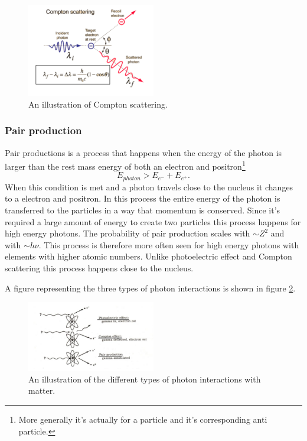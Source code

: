 \documentclass[jmp, amsmath, amssymb, reprint]{article}
\numberwithin{equation}{section}
\begin{document}
\begin{multicols}{2}
\begin{figure}[H]
	\centering
  	\includegraphics[width=0.50\textwidth]{compton.png}
	\caption{An illustration of Compton scattering.}
	\label{fig:compton}
\end{figure}


\subsubsection{Pair production}

Pair productions is a process that happens when the energy of the photon is larger than the rest mass energy of both an electron and positron\footnote{More generally it's actually for a particle and it's corresponding anti particle.}
\begin{equation}
E_{photon} > E_{e^-} + E_{e^+}.
\end{equation}
When this condition is met and a photon travels close to the nucleus it changes to a electron and positron. In this process the entire energy of the photon is transferred to the particles in a way that momentum is conserved. Since it's required a large amount of energy to create two particles this process happens for high energy photons. The probability of pair production scales with \(\sim Z^2\) and with \(\sim h\nu\). This process is therefore more often seen for high energy photons with elements with higher atomic numbers. Unlike photoelectric effect and Compton scattering this process happens close to the nucleus.

A figure representing the three types of photon interactions is shown in figure \ref{fig:photon_interactions}.

\begin{figure}[H]
	\centering
  	\includegraphics[width=0.50\textwidth]{photon_interactions.png}
	\caption{An illustration of the different types of photon interactions with matter.}
	\label{fig:photon_interactions}
\end{figure}


\end{multicols}
\end{document}
